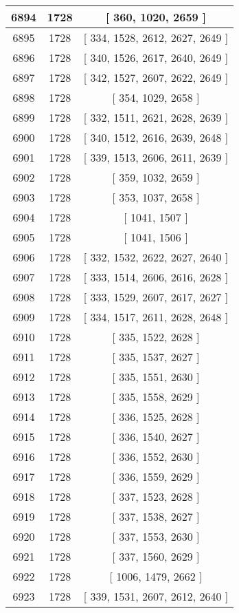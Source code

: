 \begin{center}
\begin{longtable}[H]{|| c c c ||}
\hline
6894 & 1728 & [ 360, 1020, 2659 ] \\ 
\hline
6895 & 1728 & [ 334, 1528, 2612, 2627, 2649 ] \\ 
\hline
6896 & 1728 & [ 340, 1526, 2617, 2640, 2649 ] \\ 
\hline
6897 & 1728 & [ 342, 1527, 2607, 2622, 2649 ] \\ 
\hline
6898 & 1728 & [ 354, 1029, 2658 ] \\ 
\hline
6899 & 1728 & [ 332, 1511, 2621, 2628, 2639 ] \\ 
\hline
6900 & 1728 & [ 340, 1512, 2616, 2639, 2648 ] \\ 
\hline
6901 & 1728 & [ 339, 1513, 2606, 2611, 2639 ] \\ 
\hline
6902 & 1728 & [ 359, 1032, 2659 ] \\ 
\hline
6903 & 1728 & [ 353, 1037, 2658 ] \\ 
\hline
6904 & 1728 & [ 1041, 1507 ] \\ 
\hline
6905 & 1728 & [ 1041, 1506 ] \\ 
\hline
6906 & 1728 & [ 332, 1532, 2622, 2627, 2640 ] \\ 
\hline
6907 & 1728 & [ 333, 1514, 2606, 2616, 2628 ] \\ 
\hline
6908 & 1728 & [ 333, 1529, 2607, 2617, 2627 ] \\ 
\hline
6909 & 1728 & [ 334, 1517, 2611, 2628, 2648 ] \\ 
\hline
6910 & 1728 & [ 335, 1522, 2628 ] \\ 
\hline
6911 & 1728 & [ 335, 1537, 2627 ] \\ 
\hline
6912 & 1728 & [ 335, 1551, 2630 ] \\ 
\hline
6913 & 1728 & [ 335, 1558, 2629 ] \\ 
\hline
6914 & 1728 & [ 336, 1525, 2628 ] \\ 
\hline
6915 & 1728 & [ 336, 1540, 2627 ] \\ 
\hline
6916 & 1728 & [ 336, 1552, 2630 ] \\ 
\hline
6917 & 1728 & [ 336, 1559, 2629 ] \\ 
\hline
6918 & 1728 & [ 337, 1523, 2628 ] \\ 
\hline
6919 & 1728 & [ 337, 1538, 2627 ] \\ 
\hline
6920 & 1728 & [ 337, 1553, 2630 ] \\ 
\hline
6921 & 1728 & [ 337, 1560, 2629 ] \\ 
\hline
6922 & 1728 & [ 1006, 1479, 2662 ] \\ 
\hline
6923 & 1728 & [ 339, 1531, 2607, 2612, 2640 ] \\ 

\end{longtable}
\end{center}
